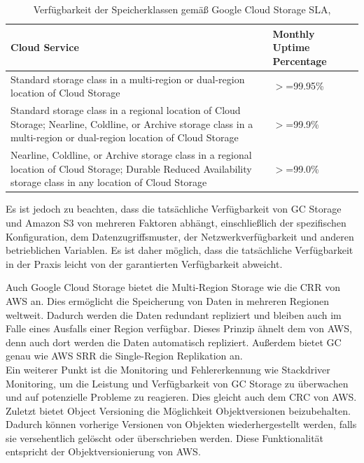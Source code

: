 \begin{table}[!h]
\centering
\begin{tabular}{ |p{5cm}|p{5cm}| }
\hline
Cloud Service & Monthly Uptime Percentage \\
\hline
\cline{1-2}
Standard storage class in a multi-region or dual-region location of Cloud Storage & $>$=99.95\% \\
\cline{1-2}
Standard storage class in a regional location of Cloud Storage; Nearline, Coldline, or Archive storage class in a multi-region or dual-region location of Cloud Storage & $>$=99.9\% \\
\cline{1-2}
Nearline, Coldline, or Archive storage class in a regional location of Cloud Storage; Durable Reduced Availability storage class in any location of Cloud Storage & $>$=99.0\% \\
\cline{1-2}
\end{tabular}
\caption{Verfügbarkeit der Speicherklassen gemäß Google Cloud Storage SLA, }
\end{table}

Es ist jedoch zu beachten, dass die tatsächliche Verfügbarkeit von GC Storage und Amazon S3 von mehreren Faktoren abhängt, einschließlich der spezifischen Konfiguration, dem Datenzugriffsmuster, der Netzwerkverfügbarkeit und anderen betrieblichen Variablen. Es ist daher möglich, dass die tatsächliche Verfügbarkeit in der Praxis leicht von der garantierten Verfügbarkeit abweicht.

Auch Google Cloud Storage bietet die Multi-Region Storage wie die CRR von AWS an. Dies ermöglicht die Speicherung von Daten in mehreren Regionen weltweit. Dadurch werden die Daten redundant repliziert und bleiben auch im Falle eines Ausfalls einer Region verfügbar. Dieses Prinzip ähnelt dem von AWS, denn auch dort werden die Daten automatisch repliziert. Außerdem bietet GC genau wie AWS SRR die Single-Region Replikation an.\\

Ein weiterer Punkt ist die Monitoring und Fehlererkennung wie Stackdriver Monitoring, um die Leistung und Verfügbarkeit von GC Storage zu überwachen und auf potenzielle Probleme zu reagieren. Dies gleicht auch dem CRC von AWS.\\

Zuletzt bietet Object Versioning die Möglichkeit Objektversionen beizubehalten. Dadurch können vorherige Versionen von Objekten wiederhergestellt werden, falls sie versehentlich gelöscht oder überschrieben werden. Diese Funktionalität entspricht der Objektversionierung von AWS.\\


